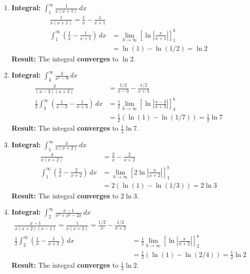 \documentclass[12pt]{article}
\begin{document}
\begin{enumerate}
    \item \textbf{Integral: } $\displaystyle \int_{1}^{\infty} \frac{1}{x(x+1)} \,dx$
    \begin{align*}
        \frac{1}{x(x+1)} = \frac{1}{x} - \frac{1}{x+1} \\
        \int_{1}^{\infty} \left(\frac{1}{x} - \frac{1}{x+1}\right) \,dx &= \lim_{b \to \infty} \left[ \ln\left|\frac{x}{x+1}\right| \right]_{1}^{b} \\
        &= \ln(1) - \ln(1/2) = \ln 2
    \end{align*}
    \textbf{Result:} The integral \textbf{converges} to $\ln 2$.
    
    \item \textbf{Integral: } $\displaystyle \int_{4}^{\infty} \frac{3}{x^2-9} \,dx$
    \begin{align*}
        \frac{3}{(x-3)(x+3)} &= \frac{1/2}{x-3} - \frac{1/2}{x+3} \\
        \frac{1}{2} \int_{4}^{\infty} \left(\frac{1}{x-3} - \frac{1}{x+3}\right) \,dx &= \frac{1}{2} \lim_{b \to \infty} \left[ \ln\left|\frac{x-3}{x+3}\right| \right]_{4}^{b} \\
        &= \frac{1}{2} \left( \ln(1) - \ln(1/7) \right) = \frac{1}{2}\ln 7
    \end{align*}
    \textbf{Result:} The integral \textbf{converges} to $\frac{1}{2}\ln 7$.

    \item \textbf{Integral: } $\displaystyle \int_{1}^{\infty} \frac{4}{x(x+2)} \,dx$
    \begin{align*}
        \frac{4}{x(x+2)} &= \frac{2}{x} - \frac{2}{x+2} \\
        \int_{1}^{\infty} \left(\frac{2}{x} - \frac{2}{x+2}\right) \,dx &= \lim_{b \to \infty} \left[ 2\ln\left|\frac{x}{x+2}\right| \right]_{1}^{b} \\
        &= 2(\ln(1) - \ln(1/3)) = 2\ln 3
    \end{align*}
    \textbf{Result:} The integral \textbf{converges} to $2\ln 3$.

    \item \textbf{Integral: } $\displaystyle \int_{2}^{\infty} \frac{x-1}{x^3+x^2-2x} \,dx$
    \begin{align*}
        \frac{x-1}{x(x+2)(x-1)} = \frac{1}{x(x+2)} = \frac{1/2}{x} - \frac{1/2}{x+2} \\
        \frac{1}{2} \int_{2}^{\infty} \left(\frac{1}{x} - \frac{1}{x+2}\right) \,dx &= \frac{1}{2} \lim_{b \to \infty} \left[ \ln\left|\frac{x}{x+2}\right| \right]_{2}^{b} \\
        &= \frac{1}{2} (\ln(1) - \ln(2/4)) = \frac{1}{2}\ln 2
    \end{align*}
    \textbf{Result:} The integral \textbf{converges} to $\frac{1}{2}\ln 2$.
    

\end{enumerate}
\end{document}
